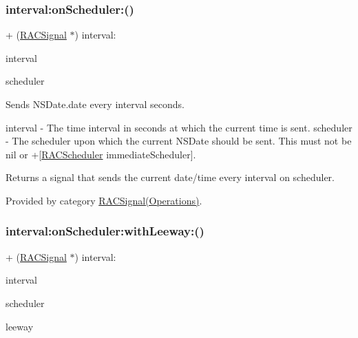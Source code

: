 \mbox{\label{interface_r_a_c_signal_a65442f423ebf08b9217f7bb206780a45}} 
\subsubsection{\texorpdfstring{interval\+:on\+Scheduler\+:()}{interval:onScheduler:()}\hspace{0.1cm}{\footnotesize\ttfamily [3/3]}}
{\footnotesize\ttfamily + (\mbox{\hyperlink{interface_r_a_c_signal}{R\+A\+C\+Signal}} $\ast$) interval\+: \begin{DoxyParamCaption}\item[{(N\+S\+Time\+Interval)}]{interval }\item[{onScheduler:(\mbox{\hyperlink{interface_r_a_c_scheduler}{R\+A\+C\+Scheduler}} $\ast$)}]{scheduler }\end{DoxyParamCaption}}

Sends N\+S\+Date.\+date every {\ttfamily interval} seconds.

interval -\/ The time interval in seconds at which the current time is sent. scheduler -\/ The scheduler upon which the current N\+S\+Date should be sent. This must not be nil or +\mbox{[}\mbox{\hyperlink{interface_r_a_c_scheduler}{R\+A\+C\+Scheduler}} immediate\+Scheduler\mbox{]}.

Returns a signal that sends the current date/time every {\ttfamily interval} on {\ttfamily scheduler}. 

Provided by category \mbox{\hyperlink{category_r_a_c_signal_07_operations_08_a65442f423ebf08b9217f7bb206780a45}{R\+A\+C\+Signal(\+Operations)}}.

\mbox{\label{interface_r_a_c_signal_acd968c129ec1afe3b5bc77db5fc13291}} 
\subsubsection{\texorpdfstring{interval\+:on\+Scheduler\+:with\+Leeway\+:()}{interval:onScheduler:withLeeway:()}\hspace{0.1cm}{\footnotesize\ttfamily [1/3]}}
{\footnotesize\ttfamily + (\mbox{\hyperlink{interface_r_a_c_signal}{R\+A\+C\+Signal}} $\ast$) interval\+: \begin{DoxyParamCaption}\item[{(N\+S\+Time\+Interval)}]{interval }\item[{onScheduler:(\mbox{\hyperlink{interface_r_a_c_scheduler}{R\+A\+C\+Scheduler}} $\ast$)}]{scheduler }\item[{withLeeway:(N\+S\+Time\+Interval)}]{leeway }\end{DoxyParamCaption}}

